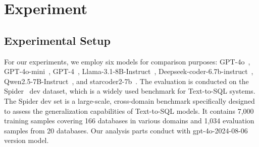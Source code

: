 

\section{Experiment}
\subsection{Experimental Setup}
For our experiments, we employ six models for comparison purposes: GPT-4o~\cite{hurst2024gpt}, GPT-4o-mini~\cite{hurst2024gpt}, GPT-4~\cite{achiam2023gpt}, Llama-3.1-8B-Instruct~\cite{dubey2024llama}, Deepseek-coder-6.7b-instruct~\cite{guo2024deepseek}, Qwen2.5-7B-Instruct~\cite{yang2024qwen2}, and starcoder2-7b~\cite{lozhkov2024starcoder}. The evaluation is conducted on the Spider~\cite{spider} dev dataset, which is a widely used benchmark for Text-to-SQL systems. The Spider dev set is a large-scale, cross-domain benchmark specifically designed to assess the generalization capabilities of Text-to-SQL models. It contains 7,000 training samples covering 166 databases in various domains and 1,034 evaluation samples from 20 databases. Our analysis parts conduct with gpt-4o-2024-08-06 version model. 




